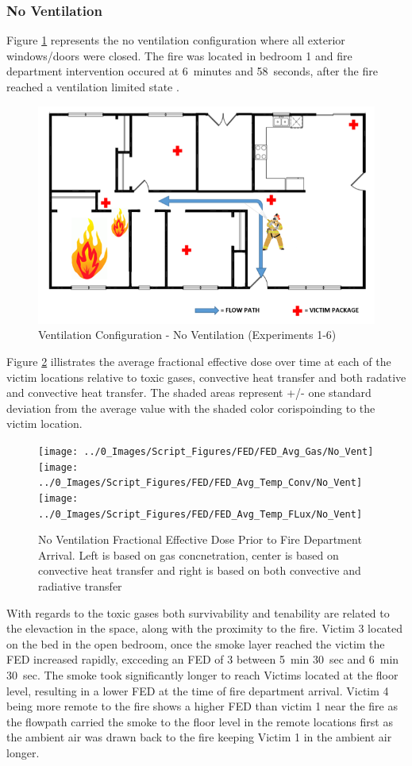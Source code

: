 \documentclass[12pt,oneside]{book}
\begin{document}
\subsubsection{No Ventilation}

Figure \ref{fig:Vent_Profile-No_Vent} represents the no ventilation configuration where all exterior windows/doors were closed. The fire was located in bedroom 1 and fire department intervention occured at 6~minutes and 58~seconds, after the fire reached a ventilation limited state . 

\begin{figure}[H]
	\centering
	\includegraphics[width=.65\textwidth]{../0_Images/Ventilation_Configurations/No_Vent.png}
	\caption{Ventilation Configuration - No Ventilation (Experiments 1-6)}
	\label{fig:Vent_Profile-No_Vent}
\end{figure}

 Figure \ref{fig:FED_NoVent} illistrates the average fractional effective dose over time at each of the victim locations relative to toxic gases, convective heat transfer and both radative and convective heat transfer. The shaded areas represent +/- one standard deviation from the average value with the shaded color corispoinding to the victim location. 

\begin{figure}[H]
	\centering
	\texttt{[image: ../0\_Images/Script\_Figures/FED/FED\_Avg\_Gas/No\_Vent]}
	\texttt{[image: ../0\_Images/Script\_Figures/FED/FED\_Avg\_Temp\_Conv/No\_Vent]} 
	\texttt{[image: ../0\_Images/Script\_Figures/FED/FED\_Avg\_Temp\_FLux/No\_Vent]}
	\caption[No Vent Fractional Effective Dose]{No Ventilation Fractional Effective Dose Prior to Fire Department Arrival. Left is based on gas concnetration, center is based on convective heat transfer and right is based on both convective and radiative transfer}
	\label{fig:FED_NoVent}
\end{figure}

With regards to the toxic gases both survivability and tenability are related to the elevaction in the space, along with the proximity to the fire. Victim 3 located on the bed in the open bedroom, once the smoke layer reached the victim the FED increased rapidly, excceding an FED of 3 between 5~min 30~sec and 6~min 30~sec. The smoke took significantly longer to reach Victims located at the floor level, resulting in a lower FED at the time of fire department arrival. Victim 4 being more remote to the fire shows a higher FED than victim 1 near the fire as the flowpath carried the smoke to the floor level in the remote locations first as the ambient air was drawn back to the fire keeping Victim 1 in the ambient air longer. 
\end{document}
